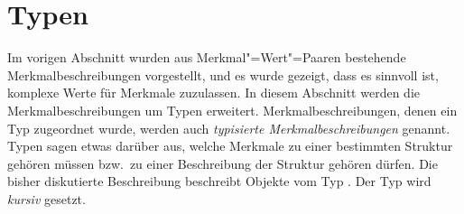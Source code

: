 \section{Typen}
\label{sec-formalismus-typen}

\largerpage[2]
Im vorigen Abschnitt wurden aus Merkmal"=Wert"=Paaren bestehende
Merkmalbeschreibungen vorgestellt, und es wurde gezeigt, dass es sinnvoll ist,
komplexe Werte für Merkmale zuzulassen.  In diesem Abschnitt werden die
Merkmalbeschreibungen um Typen erweitert. Merkmalbeschreibungen, denen ein Typ
zugeordnet wurde, werden auch \emph{typisierte Merkmalbeschreibungen} genannt.
Typen sagen etwas darüber aus, welche Merkmale zu einer
bestimmten Struktur gehören müssen bzw.\ zu einer Beschreibung der
Struktur gehören dürfen. Die bisher diskutierte Beschreibung beschreibt
Objekte vom Typ .
\ea
{}
\z
Der Typ wird \textit{kursiv} gesetzt.\pagebreak 

